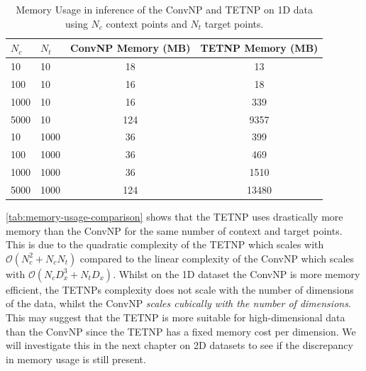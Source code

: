 \documentclass[../../main.tex]{subfiles}
\begin{document}
\begin{table}[]
	\centering
	\begin{tabular}{@{}llcc@{}}
	\toprule
	$N_c$ & $N_t$ & ConvNP Memory (MB) & TETNP Memory (MB) \\ \midrule
	10    & 10    & 18                 & 13                \\
	100   & 10    & 16                 & 18                \\
	1000  & 10    & 16                 & 339               \\
	5000  & 10    & 124                & 9357              \\ \midrule
	10    & 1000  & 36                 & 399               \\
	100   & 1000  & 36                 & 469               \\
	1000  & 1000  & 36                 & 1510              \\
	5000  & 1000  & 124                & 13480             \\ \bottomrule
	\end{tabular}
	\caption{Memory Usage in inference of the ConvNP and TETNP on 1D data using $N_c$ context points and $N_t$ target points.}
	\label{tab:memory-usage-comparison}
\end{table}

\autoref{tab:memory-usage-comparison} shows that the TETNP uses drastically more memory than the ConvNP for the same number of context and target points. This is due to the quadratic complexity of the TETNP which scales with $\mathcal{O}(N_c^2 + N_cN_t)$ compared to the linear complexity of the ConvNP which scales with $\mathcal{O}(N_cD_x^3 + N_tD_x)$. Whilst on the 1D dataset the ConvNP is more memory efficient, the TETNPs complexity does not scale with the number of dimensions of the data, whilst the ConvNP \emph{scales cubically with the number of dimensions}. This may suggest that the TETNP is more suitable for high-dimensional data than the ConvNP since the TETNP has a fixed memory cost per dimension. We will investigate this in the next chapter on 2D datasets to see if the discrepancy in memory usage is still present.

\ifSubfilesClassLoaded{%
    \printbibliography{}
}{} 
\end{document}
